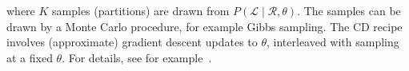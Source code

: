 \documentclass[a4paper,oneside,12pt,english]{report}
\def\expv#1#2{\bigl\langle#1\bigr\rangle_{#2}}
\def\Lset{\mathcal{L}}
\def\Rset{\mathcal{R}}
\begin{document}
where $K$ samples (partitions) are drawn from $P(\Lset\mid\Rset,\theta)$. The samples can be drawn by a Monte Carlo procedure, for example Gibbs sampling. The CD recipe involves (approximate) gradient descent updates to $\theta$, interleaved with sampling at a fixed $\theta$. For details, see for example~\cite{pcd}.


\end{document}
